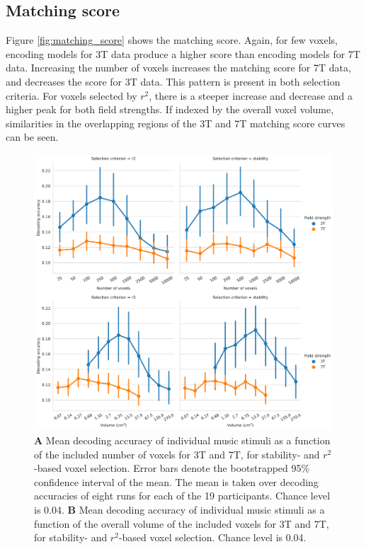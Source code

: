 \subsection*{Matching score}

Figure \ref{fig:matching_score} shows the matching score. Again, for few
voxels, encoding models for 3T data produce a higher score than encoding
models for 7T data. Increasing the number of voxels increases the matching
score for 7T data, and decreases the score for 3T data. This pattern
is present in both selection criteria. For voxels selected by $r^2$, there is a
steeper increase and decrease and a higher peak for both field strengths.  If
indexed by the overall voxel volume, similarities in the overlapping regions of
the 3T and 7T matching score curves can be seen.

\begin{figure}
  \centering
    \includegraphics[width=\linewidth]{pics/decoding.pdf}

	\caption{\textbf{A} Mean decoding accuracy of individual music stimuli as a function of
  the included number of voxels for 3T and 7T, for stability- and
  $r^2$-based voxel selection. Error bars denote the bootstrapped 95\%
  confidence interval of the mean. The mean is taken over decoding
  accuracies of eight runs for each of the 19 participants. Chance level is
    0.04. \textbf{B} Mean
decoding accuracy of individual music stimuli as a function of the overall volume of the
included voxels for 3T and 7T, for stability- and $r^2$-based voxel
selection. Chance level is 0.04.
}
 \label{fig:decoding_accuracy_stimulus}
\end{figure}

